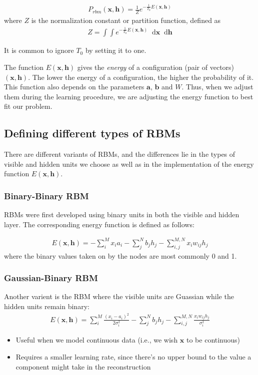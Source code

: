 \documentclass[norsk,a4paper,11pt]{article}
\newcommand*\diff{\mathop{}\!\mathrm{d}}
\newcommand{\Vx}{\mathbf{x}}
\newcommand{\Vh}{\mathbf{h}}
\newcommand{\Va}{\mathbf{a}}
\newcommand{\Vb}{\mathbf{b}}
\begin{document}
\begin{align}
	P_{rbm}(\Vx,\mathbf{h}) = \frac{1}{Z} e^{-\frac{1}{T_0}E(\Vx,\mathbf{h})}
\end{align}
where $Z$ is the normalization constant or partition function, defined as 
\begin{align}
	Z = \int \int e^{-\frac{1}{T_0}E(\Vx,\mathbf{h})} \diff \Vx \diff \mathbf{h}
\end{align}

It is common to ignore $T_0$ by setting it to one. 

The function $E(\Vx,\mathbf{h})$ gives the \textit{energy} of a configuration (pair of vectors) $(\Vx, \Vh)$. The lower the energy of a configuration, the higher the probability of it. This function also depends on the parameters $\Va$, $\Vb$ and $W$. Thus, when we adjust them during the learning procedure, we are adjusting the energy function to best fit our problem.

\subsection{Defining different types of RBMs}
There are different variants of RBMs, and the differences lie in the types of visible and hidden units we choose as well as in the implementation of the energy function $E(\Vx,\mathbf{h})$. 

\subsubsection{Binary-Binary RBM}
RBMs were first developed using binary units in both the visible and hidden layer. The corresponding energy function is defined as follows:

\begin{align}
	E(\Vx, \mathbf{h}) = - \sum_i^M x_i a_i- \sum_j^N b_j h_j - \sum_{i,j}^{M,N} x_i w_{ij} h_j
\end{align}
where the binary values taken on by the nodes are most commonly 0 and 1.

\subsubsection{Gaussian-Binary RBM}
Another varient is the RBM where the visible units are Guassian while the hidden units remain binary:
\begin{align}
	E(\Vx, \mathbf{h}) = \sum_i^M \frac{(x_i - a_i)^2}{2\sigma_i^2} - \sum_j^N b_j h_j - \sum_{i,j}^{M,N} \frac{x_i w_{ij} h_j}{\sigma_i^2} 
\end{align}
\begin{itemize}
	\item Useful when we model continuous data (i.e., we wish $\Vx$ to be continuous)
	\item Requires a smaller learning rate, since there's no upper bound to the value a component might take in the reconstruction
\end{itemize}
\end{document}

